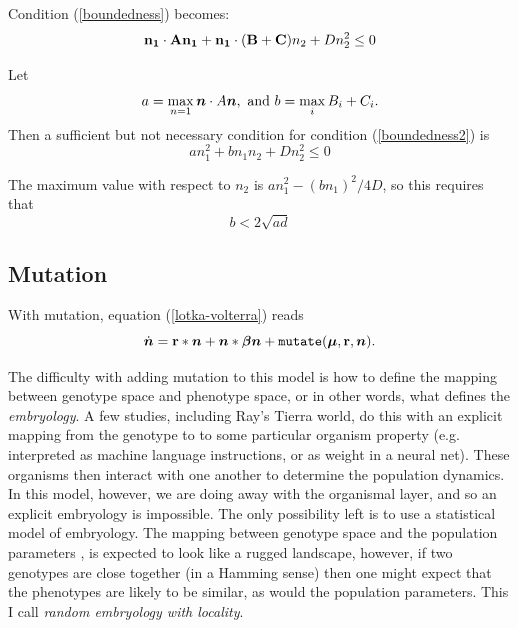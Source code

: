 Condition (\ref{boundedness}) becomes:
\begin{equation}\label{boundedness2}
{\bf n_1}\cdot{\bf A}{\bf n_1} + {\bf n_1}\cdot({\bf B}+{\bf C})n_2 +
Dn_2^2 \leq 0
\end{equation}

Let 
\begin{displaymath}
a=\max_{n=1} \mbox{\boldmath{$n$}}\cdot A\mbox{\boldmath{$n$}},\mbox{ and } b=\max_{i}B_i+C_i.
\end{displaymath}
 Then a sufficient but
not necessary condition for condition (\ref{boundedness2}) is
\begin{displaymath}
an_1^2+bn_1n_2+Dn_2^2\leq0
\end{displaymath}

The maximum value with respect to $n_2$ is $an_1^2-(bn_1)^2/4D$, so
this requires that
\begin{equation}\label{boundedness3}
b < 2\sqrt{ad}
\end{equation}

\subsection{Mutation}

With mutation, equation (\ref{lotka-volterra}) reads
\begin{equation}
\dot{\mbox{\boldmath{$n$}}} = \mbox{${\bf r}$}*\mbox{\boldmath{$n$}} + \mbox{\boldmath{$n$}}*\mbox{\boldmath{$\beta$}}\mbox{\boldmath{$n$}} + {\tt mutate}(\mbox{\boldmath{$\mu$}},\mbox{${\bf r}$},\mbox{\boldmath{$n$}}).
\end{equation}


The difficulty with adding mutation to this model is how to define the
mapping between genotype space and phenotype space, or in other words,
what defines the {\em embryology}. A few studies, including Ray's
Tierra world, do this with an explicit mapping from the genotype to to
some particular organism property (e.g. interpreted as machine language
instructions, or as weight in a neural net). These organisms then
interact with one another to determine the population dynamics. In
this model, however, we are doing away with the organismal layer, and
so an explicit embryology is impossible. The only possibility left is
to use a statistical model of embryology. The mapping between
genotype space and the population parameters \br,
\bbeta{}  is expected to look like a rugged
landscape, however, if two genotypes are close together (in a Hamming
sense) then one might expect that the phenotypes are likely to be
similar, as would the population parameters. This I call {\em random
embryology with locality}.

